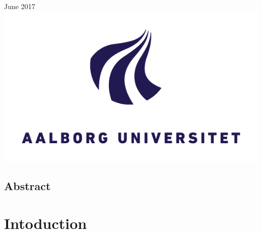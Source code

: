 \documentclass[a4paper]{report}
\theoremstyle{plain}
\begin{document}
\begin{titlepage}


{\large June 2017}\\[2cm] %


\includegraphics{AAU_LOGO.png}\\[1cm] %
 

\vfill %

\end{titlepage}



\chapter*{Abstract}

\clearpage

\tableofcontents


\part{Intoduction}
\clearpage
\end{document}
